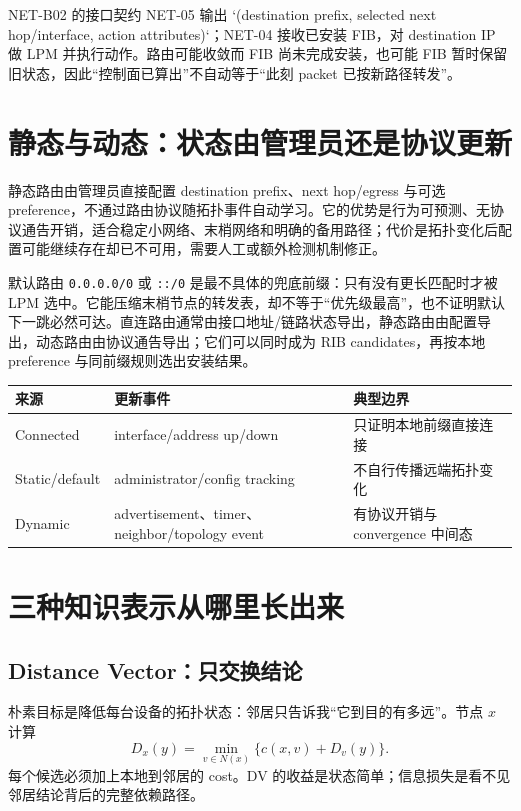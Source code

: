 \documentclass[11pt,a4paper]{ctexart}
\newcommand{\code}[1]{\texttt{#1}}
\begin{document}
\begin{methodbox}{NET-B02 的接口契约}
NET-05 输出 `(destination prefix, selected next hop/interface, action attributes)`；NET-04 接收已安装 FIB，对 destination IP 做 LPM 并执行动作。路由可能收敛而 FIB 尚未完成安装，也可能 FIB 暂时保留旧状态，因此“控制面已算出”不自动等于“此刻 packet 已按新路径转发”。
\end{methodbox}

\section{静态与动态：状态由管理员还是协议更新}

静态路由由管理员直接配置 destination prefix、next hop/egress 与可选 preference，不通过路由协议随拓扑事件自动学习。它的优势是行为可预测、无协议通告开销，适合稳定小网络、末梢网络和明确的备用路径；代价是拓扑变化后配置可能继续存在却已不可用，需要人工或额外检测机制修正。

默认路由 \code{0.0.0.0/0} 或 \code{::/0} 是最不具体的兜底前缀：只有没有更长匹配时才被 LPM 选中。它能压缩末梢节点的转发表，却不等于“优先级最高”，也不证明默认下一跳必然可达。直连路由通常由接口地址/链路状态导出，静态路由由配置导出，动态路由由协议通告导出；它们可以同时成为 RIB candidates，再按本地 preference 与同前缀规则选出安装结果。

\begin{center}\small
\begin{tabularx}{\linewidth}{L{2.2cm}Y Y}
\toprule
来源 & 更新事件 & 典型边界\\
\midrule
Connected & interface/address up/down & 只证明本地前缀直接连接\\
Static/default & administrator/config tracking & 不自行传播远端拓扑变化\\
Dynamic & advertisement、timer、neighbor/topology event & 有协议开销与 convergence 中间态\\
\bottomrule
\end{tabularx}
\end{center}

\section{三种知识表示从哪里长出来}

\subsection{Distance Vector：只交换结论}

朴素目标是降低每台设备的拓扑状态：邻居只告诉我“它到目的有多远”。节点 $x$ 计算
\[
D_x(y)=\min_{v\in N(x)}\{c(x,v)+D_v(y)\}.
\]
每个候选必须加上本地到邻居的 cost。DV 的收益是状态简单；信息损失是看不见邻居结论背后的完整依赖路径。
\end{document}

